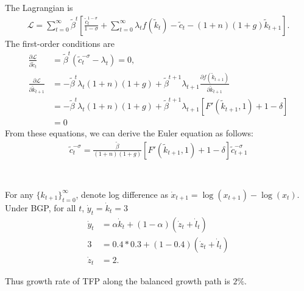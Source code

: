 \documentclass{ltjsarticle}
\begin{document}
The Lagrangian is
\begin{gather*}
    \mathcal{L} = \sum_{t=0}^\infty \tilde{\beta}^t \left[ \frac{\tilde{c}_{t}^{1-\sigma}}{1-\sigma} + \sum_{t=0}^\infty \lambda_t  f(\tilde{k}_t) - \tilde{c}_t - (1+n)(1+g) \tilde{k}_{t+1} \right].
\end{gather*}
The first-order conditions are
\begin{align*}
    \frac{\partial \mathcal{L}}{\partial \tilde{c}_t} &= \tilde{\beta}^t ( \tilde{c}_{t}^{-\sigma} - \lambda_t) = 0, \\
    \frac{\partial \mathcal{L}}{\partial \tilde{k}_{t+1}} &= - \tilde{\beta}^t \lambda_t (1+n)(1+g) +  \tilde{\beta}^{t+1} \lambda_{t+1} \frac{\partial f(\tilde{k}_{t+1})}{\partial \tilde{k}_{t+1}}\\
    &= - \tilde{\beta}^t \lambda_t (1+n)(1+g) +  \tilde{\beta}^{t+1} \lambda_{t+1}[F'(\tilde{k}_{t+1},1)+1-\delta]\\
    &= 0
\end{align*}
From these equations, we can derive the Euler equation as follows:
\begin{gather*}
    \tilde{c}_t^{-\sigma} = \frac{\tilde{\beta}}{(1+n)(1+g)} [F'(\tilde{k}_{t+1},1)+1-\delta] \tilde{c}_{t+1}^{-\sigma} \\
\end{gather*}





\section{} %
For any $\{k_{t+1} \}^{\infty}_{t=0}$, denote log difference as $\dot{x}_{t+1}= \log(x_{t+1})-\log(x_{t})$.\\
Under BGP, for all $t$,  $\dot{y}_t = \dot{k}_t = 3$
\begin{align*}
    \dot{y}_t &= \alpha \dot{k}_t + (1-\alpha)(\dot{z}_t + \dot{l}_t)\\
    3&= 0.4*0.3 + (1-0.4)(\dot{z}_t + \dot{l}_t)\\
    \dot{z}_t &= 2.
\end{align*}

Thus growth rate of TFP along the balanced growth path is $2\%$.
\end{document}
